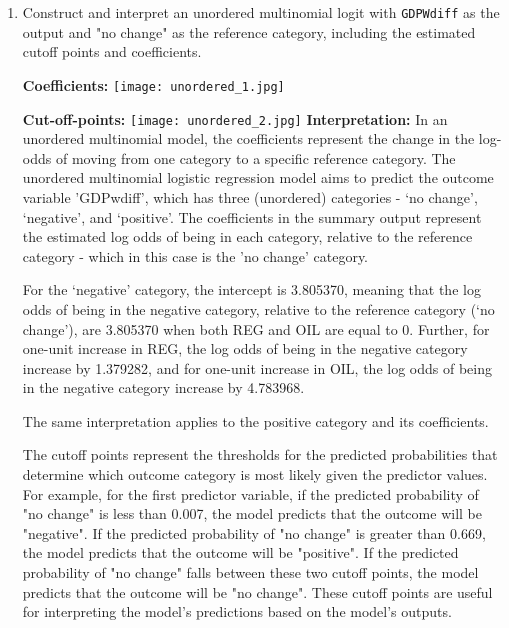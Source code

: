 \documentclass[12pt,letterpaper]{article}
\begin{document}
\begin{enumerate}
	\item Construct and interpret an unordered multinomial logit with \texttt{GDPWdiff} as the output and "no change" as the reference category, including the estimated cutoff points and coefficients.
	
\vspace{0.2cm}
 
\textbf{Coefficients: }
\linebreak
	\texttt{[image: unordered\_1.jpg]}
\linebreak
 
\textbf{Cut-off-points:}
\linebreak
	\texttt{[image: unordered\_2.jpg]}
\linebreak
\textbf{Interpretation:}
\linebreak
In an unordered multinomial model, the coefficients represent the change in the log-odds of moving from one category to a specific reference category. The unordered multinomial logistic regression model aims to predict the outcome variable 'GDPwdiff', which has three (unordered) categories -  ‘no change’, ‘negative’, and ‘positive’. The coefficients in the summary output represent the estimated log odds of being in each category, relative to the reference category - which in this case is the ’no change’ category. 

For the ‘negative’ category, the intercept is 3.805370, meaning that the log odds of being in the negative category, relative to the reference category (‘no change’), are 3.805370 when both REG and OIL are equal to 0. Further, for one-unit increase in REG, the log odds of being in the negative category increase by 1.379282, and for one-unit increase in OIL, the log odds of being in the negative category increase by 4.783968.

The same interpretation applies to the positive category and its coefficients.

The cutoff points represent the thresholds for the predicted probabilities that determine which outcome category is most likely given the predictor values. For example, for the first predictor variable, if the predicted probability of "no change" is less than 0.007, the model predicts that the outcome will be "negative". If the predicted probability of "no change" is greater than 0.669, the model predicts that the outcome will be "positive". If the predicted probability of "no change" falls between these two cutoff points, the model predicts that the outcome will be "no change".
These cutoff points are useful for interpreting the model's predictions based on the model's outputs.


\end{enumerate}
\end{document}
